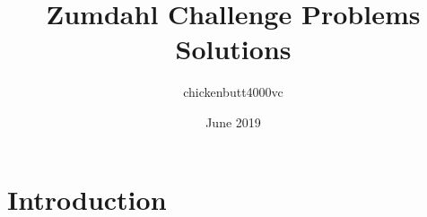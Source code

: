 \documentclass{article}
\title{Zumdahl Challenge Problems Solutions}
\author{chickenbutt4000vc }
\date{June 2019}
\begin{document}
\maketitle

\section{Introduction}
\end{document}
